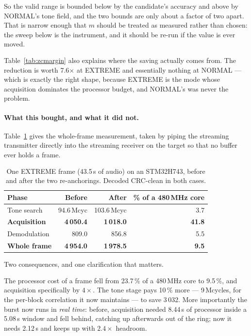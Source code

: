 So the valid range is bounded below by the candidate's accuracy and
above by NORMAL's tone field, and the two bounds are only about a factor
of two apart. That is narrow enough that $m$ should be treated as
measured rather than chosen: the sweep below is the instrument, and it
should be re-run if the value is ever moved.

Table~\ref{tab:zcmargin} also explains where the saving actually comes
from. The reduction is worth 7.6$\times$ at EXTREME and essentially
nothing at NORMAL --- which is exactly the right shape, because EXTREME
is the mode whose acquisition dominates the processor budget, and
NORMAL's was never the problem.

\paragraph{What this bought, and what it did not.}
Table~\ref{tab:cport_stages} gives the whole-frame measurement, taken by
piping the streaming transmitter directly into the streaming receiver on
the target so that no buffer ever holds a frame.

\begin{table}[htbp]
    \centering
    \caption{One EXTREME frame (43.5\,s of audio) on an STM32H743,
             before and after the two re-anchorings. Decoded CRC-clean
             in both cases.}
    \label{tab:cport_stages}
    \small
    \begin{tabular}{@{}lrrr@{}}
    \toprule
    \textbf{Phase} & \textbf{Before} & \textbf{After} & \textbf{\% of a
    480\,MHz core} \\
    \midrule
    Tone search & 94.6\,Mcyc & 103.6\,Mcyc & 3.7 \\
    \textbf{Acquisition} & \textbf{4\,050.4} & \textbf{1\,018.0} &
        \textbf{41.8} \\
    Demodulation & 809.0 & 856.8 & 5.5 \\
    \midrule
    \textbf{Whole frame} & \textbf{4\,954.0} & \textbf{1\,978.5} &
        \textbf{9.5} \\
    \bottomrule
    \end{tabular}
\end{table}

Two consequences, and one clarification that matters.

The processor cost of a frame fell from 23.7\,\% of a 480\,MHz core to
9.5\,\%, and acquisition specifically by $4\times$. The tone stage pays
10\,\% more --- 9\,Mcycles, for the per-block correlation it now
maintains --- to save 3\,032. More importantly the burst now runs in
\emph{real time}: before, acquisition needed 8.44\,s of processor inside
a 5.08\,s window and fell behind, catching up afterwards out of the ring;
now it needs 2.12\,s and keeps up with $2.4\times$ headroom.

